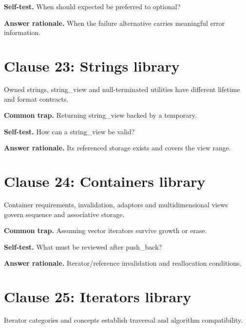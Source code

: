 \documentclass[11pt]{article}
\begin{document}
\textbf{Self-test.} When should expected be preferred to optional?

\textbf{Answer rationale.} When the failure alternative carries meaningful error information.

\section{Clause 23: Strings library}
Owned strings, string\_view and null-terminated utilities have different lifetime and format contracts.

\textbf{Common trap.} Returning string\_view backed by a temporary.

\textbf{Self-test.} How can a string\_view be valid?

\textbf{Answer rationale.} Its referenced storage exists and covers the view range.

\section{Clause 24: Containers library}
Container requirements, invalidation, adaptors and multidimensional views govern sequence and associative storage.

\textbf{Common trap.} Assuming vector iterators survive growth or erase.

\textbf{Self-test.} What must be reviewed after push\_back?

\textbf{Answer rationale.} Iterator/reference invalidation and reallocation conditions.

\section{Clause 25: Iterators library}
Iterator categories and concepts establish traversal and algorithm compatibility.
\end{document}
